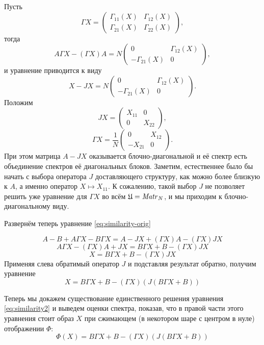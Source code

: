 Пусть
\[ \Gamma X =
\begin{pmatrix}
    \Gamma_{11}(X) & \Gamma_{12}(X) \\
    \Gamma_{21}(X) & \Gamma_{22}(X)
\end{pmatrix}, \]
тогда
\[
    A \Gamma X - (\Gamma X) A =
    N
    \begin{pmatrix}
        0               & \Gamma_{12}(X) \\
        -\Gamma_{21}(X) & 0
    \end{pmatrix},
\]
и уравнение приводится к виду
\[
    X - JX =
    N
    \begin{pmatrix}
        0               & \Gamma_{12}(X) \\
        -\Gamma_{21}(X) & 0
    \end{pmatrix}.
\]
Положим
\[
    JX = \begin{pmatrix}
        X_{11} & 0 \\
        0      & X_{22}
    \end{pmatrix},
    \]
\[ \Gamma X =
\frac1N
    \begin{pmatrix}
        0       & X_{12} \\
        -X_{21} & 0
    \end{pmatrix}.
    \]
При этом матрица \( A - JX \) оказывается блочно-диагональной
и её спектр есть объединение спектров её диагональных блоков.
Заметим, естественнее было бы начать с выбора оператора \( J \) доставляющего структуру,
как можно более близкую к \( A \), а именно
оператор \( X\mapsto X_{11} \).
К сожалению, такой выбор \( J \) не позволяет решить
уже уравнение для \(\Gamma X\) во всём \(\mathfrak U = \mathit{Matr}_{N} {}\),
и мы приходим к блочно-диагональному виду.

Развернём теперь уравнение \eqref{eq:similarity-orig}

\[
    A - B + A\Gamma X - B\Gamma X = A - JX + (\Gamma X) A - (\Gamma X) JX
    \]
\[
    A\Gamma X - (\Gamma X) A + JX = B \Gamma X + B - (\Gamma X) JX
    \]
\[
    X = B \Gamma X + B - (\Gamma X) JX
    \]
Применяя слева обратимый оператор \( J \) и подставляя результат обратно, получим уравнение
\begin{equation}\label{eq:similarity2}
    X = B \Gamma X + B - (\Gamma X) (J(B\Gamma X + B))
\end{equation}

Теперь мы докажем существование единственного решения уравнения \eqref{eq:similarity2}
и выведем оценки спектра,
показав, что в правой части этого уравнения стоит образ \( X \)
при сжимающем (в некотором шаре с центром в нуле) отображении \( \Phi \):
\[ \Phi(X) = B \Gamma X + B - (\Gamma X) (J(B\Gamma X + B)) \]

